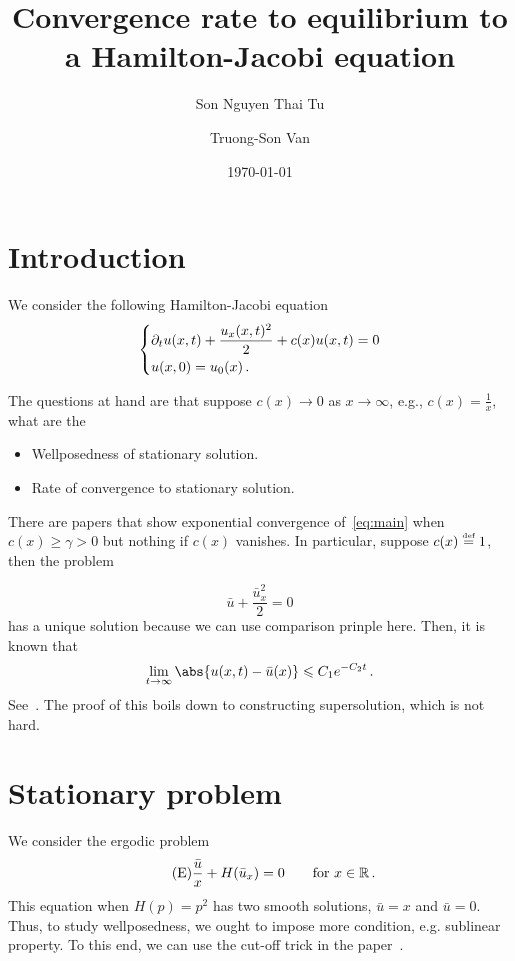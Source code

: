 \documentclass[12pt]{article}
\title{ Convergence rate to equilibrium to a Hamilton-Jacobi equation }
\author[1]{Son Nguyen Thai Tu}
\author[2]{Truong-Son Van}
\affil[1]{University of Wisconsin, Madison}
\affil[2]{Carnegie Mellon University}
\date{\today}
\begin{document}
\maketitle

\section{Introduction}
We consider the following Hamilton-Jacobi equation 
\begin{equation} \label{eq:main}
    \begin{dcases}
        \partial_t u(x,t) + \frac{u_x(x,t)^2}{2} + c(x)u(x,t) = 0     \\
        u(x,0) = u_0(x) \,.
    \end{dcases}
\end{equation}

The questions at hand are that suppose $c(x) \to 0$ as $x\to \infty$, e.g., $c(x) = \frac{1}{x}$, what are the
\begin{itemize}
    \item Wellposedness of stationary solution.
    \item Rate of convergence to stationary solution.
\end{itemize}

There are papers that show exponential convergence of~\eqref{eq:main} when $c(x) \geq \gamma >0$ but nothing if $c(x)$ vanishes. In particular, suppose $c(x) \stackrel{\scriptscriptstyle\textup{def}}{=} 1 $, then the problem 

\begin{equation}
    \bar u + \frac{\bar u_x^2}{2}  =  0
\end{equation}
has a unique solution because we can use comparison prinple here.
Then, it is known that 
\begin{equation*}
    \lim_{t\to\infty} \abs{ u(x,t) -  \bar u(x)} \leq C_1e^{-C_2t} \,.
\end{equation*}
See~\cite{FujitaLoreti2009}. The proof of this boils down to constructing supersolution, which is not hard.

\section{Stationary problem}
We consider the ergodic problem 
\begin{equation}\label{eq:ergodic}
    \tag{E}
    \frac{\bar u}{x} + H(\bar u_x) = 0 \qquad \text{for } x\in \mathbb{R}\,.
\end{equation}
This equation when $H(p) = p^2$ has two smooth solutions, $\bar u = x$ and $\bar u = 0$.
Thus, to study wellposedness, we ought to impose more condition, e.g. sublinear property.
To this end, we can use the cut-off trick in the paper~\cite{TranVan2019}.


\printbibliography 
%
%
\end{document}
